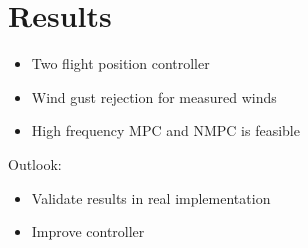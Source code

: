 \ETHslide
\section*{Results}
\vspace*{\fill}

\begin{itemize}
\item[\ETHitem] Two flight position controller
\item[\ETHitem] Wind gust rejection for measured winds
\item[\ETHitem] High frequency MPC and NMPC is feasible
\end{itemize}
Outlook:
\begin{itemize}
\item[\ETHitem] Validate results in real implementation
\item[\ETHitem] Improve controller
\end{itemize}

\vspace*{\fill}
\clearpage